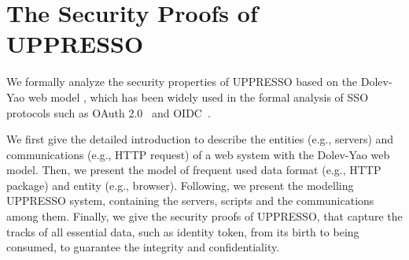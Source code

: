 \appendix

\renewcommand{\algorithmicrequire}{\textbf{Input:}}
\newcommand{\deflet}{\textbf{let}}
\newcommand{\mystate}[1]{\STATE \textbf{let} {{}#1}}
\newcommand{\mystop}[1]{\STATE \textbf{stop} \myss{\myangle{{{}#1}}, s'}}
\newcommand{\myss}[1]{${{}#1}$}
\newcommand{\myangle}[1]{\langle {{}#1} \rangle}
\newcommand{\myif}[1]{\IF{\myss{{{}#1}}}}
\newcommand{\myelse}[1]{\ELSIF{\myss{{{}#1}}}}
\newcommand{\SWITCH}[1]{\STATE \textbf{switch} #1\ \textbf{do} \begin{ALC@g}}
\newcommand{\ENDSWITCH}{\end{ALC@g}\STATE \textbf{end switch}}
\newcommand{\CASE}[1]{\STATE \textbf{case} #1\textbf{:} \begin{ALC@g}}
\newcommand{\ENDCASE}{\end{ALC@g}}
\newcommand{\CASELINE}[1]{\STATE \textbf{case} #1\textbf{:} }
\newcommand{\DEFAULT}{\STATE \textbf{default:} \begin{ALC@g}}
\newcommand{\ENDDEFAULT}{\end{ALC@g}}
\newcommand{\DEFAULTLINE}[1]{\STATE \textbf{default:} }




\section{The Security Proofs of UPPRESSO}
\label{ape:model}
We  formally analyze  the security properties of UPPRESSO based on the Dolev-Yao web model \cite{SPRESSO},
 which has been widely used in the formal analysis of SSO protocols such as OAuth 2.0~\cite{FettKS16} and OIDC~\cite{FettKS17}.

We first give the detailed introduction to describe the entities (e.g., servers) and communications (e.g., HTTP request) of a web system
    with the Dolev-Yao web model.
Then, we present the model of frequent used data format (e.g., HTTP package) and entity  (e.g., browser).
Following, we present the modelling UPPRESSO system, containing the servers, scripts and the communications among them.
Finally, we give the security proofs of UPPRESSO, that capture the tracks of all essential data, such as identity token, from its birth to being consumed, to guarantee the integrity and confidentiality.







